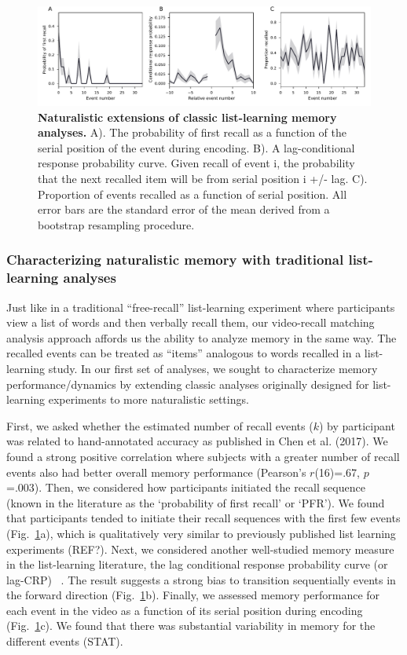 \documentclass{article}
\begin{document}
{\begin{figure}[t!]
\centering
\includegraphics[width=1\textwidth]{figs/3_list_learning.pdf}
\caption{\small \textbf{Naturalistic extensions of classic list-learning memory analyses.} A). The probability of first recall as a function of the serial position of the event during encoding. B). A lag-conditional response probability curve. Given recall of event i, the probability that the next recalled item will be from serial position i +/- lag. C). Proportion of events recalled as a function of serial position. All error bars are the standard error of the mean derived from a bootstrap resampling procedure.}
\label{fig:list-learning}
\end{figure}

\subsubsection{Characterizing naturalistic memory with traditional list-learning analyses}
Just like in a traditional ``free-recall'' list-learning experiment where participants view a list of words and then verbally recall them, our video-recall matching analysis approach affords us the ability to analyze memory in the same way. The recalled events can be treated as ``items'' analogous to words recalled in a list-learning study. In our first set of analyses, we sought to characterize memory performance/dynamics by extending classic analyses originally designed for list-learning experiments to more naturalistic settings.

First, we asked whether the estimated number of recall events ($k$) by participant was related to hand-annotated accuracy as published in Chen et al. (2017).  We found a strong positive correlation where subjects with a greater number of recall events also had better overall memory performance (Pearson's $r$(16)=.67, $p$=.003). Then, we considered how participants initiated the recall sequence (known in the literature as the `probability of first recall' or `PFR'). We found that participants tended to initiate their recall sequences with the first few events (Fig.~\ref{fig:list-learning}a), which is qualitatively very similar to previously published list learning experiments (REF?). Next, we considered another well-studied memory measure in the list-learning literature, the lag conditional response probability curve (or lag-CRP) ~\citep{Kaha96}. The result suggests a strong bias to transition sequentially events in the forward direction (Fig.~\ref{fig:list-learning}b). Finally, we assessed memory performance for each event in the video as a function of its serial position during encoding (Fig.~\ref{fig:list-learning}c). We found that there was substantial variability in memory for the different events (STAT).

}
\end{document}
